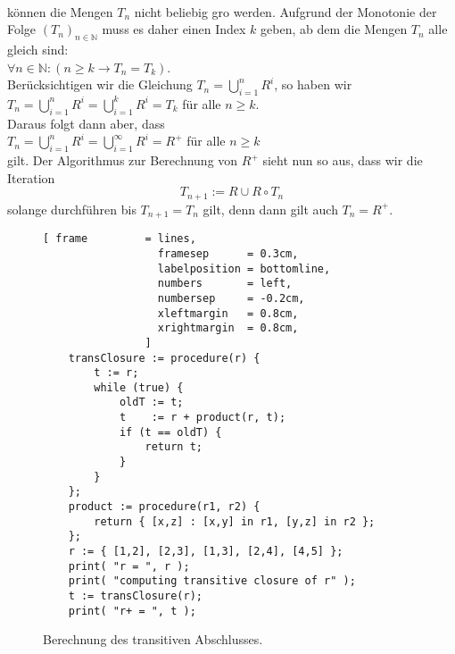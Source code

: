\\[0.2cm]
k\"{o}nnen die Mengen $T_n$ nicht beliebig gro\3 werden.  Aufgrund der Monotonie der Folge
$(T_n)_{n\in\mathbb{N}}$ muss es daher einen Index $k$ geben, ab dem die Mengen $T_n$ alle gleich sind:
\\[0.2cm]
\hspace*{1.3cm}
$\forall n \in \mathbb{N}:( n \geq k \rightarrow T_n = T_k)$.
\\[0.2cm]
Ber\"{u}cksichtigen wir die Gleichung $T_n = \bigcup_{i=1}^{n} R^i$, so haben wir 
\\[0.2cm]
\hspace*{1.3cm}
$T_n = \bigcup\limits_{i=1}^{n} R^i = \bigcup\limits_{i=1}^{k} R^i = T_k$ \quad f\"{u}r alle $n \geq k$.
\\[0.2cm]
Daraus folgt dann aber, dass
\\[0.2cm]
\hspace*{1.3cm}
$T_n = \bigcup\limits_{i=1}^{n} R^i = \bigcup\limits_{i=1}^{\infty} R^i = R^+$ 
\quad f\"{u}r alle $n \geq k$  
\\[0.2cm]
gilt.  Der Algorithmus zur Berechnung von $R^+$ sieht nun so aus, dass wir die Iteration
\[ T_{n+1} := R \cup R \circ T_n \]
solange durchf\"{u}hren bis $T_{n+1} = T_n$ gilt, denn dann gilt auch $T_n = R^+$.


\begin{figure}[!ht]
  \centering
\begin{Verbatim}[ frame         = lines, 
                  framesep      = 0.3cm, 
                  labelposition = bottomline,
                  numbers       = left,
                  numbersep     = -0.2cm,
                  xleftmargin   = 0.8cm,
                  xrightmargin  = 0.8cm,
                ]
    transClosure := procedure(r) {
        t := r;
        while (true) {
            oldT := t;
            t    := r + product(r, t);
            if (t == oldT) {
                return t;
            }
        }
    };
    product := procedure(r1, r2) {
        return { [x,z] : [x,y] in r1, [y,z] in r2 };
    };
    r := { [1,2], [2,3], [1,3], [2,4], [4,5] };
    print( "r = ", r );
    print( "computing transitive closure of r" );
    t := transClosure(r);
    print( "r+ = ", t );
\end{Verbatim} 
\vspace*{-0.3cm}
\caption{Berechnung des transitiven Abschlusses.}  
\label{fig:transitive-closure.stlx}
\end{figure} %

